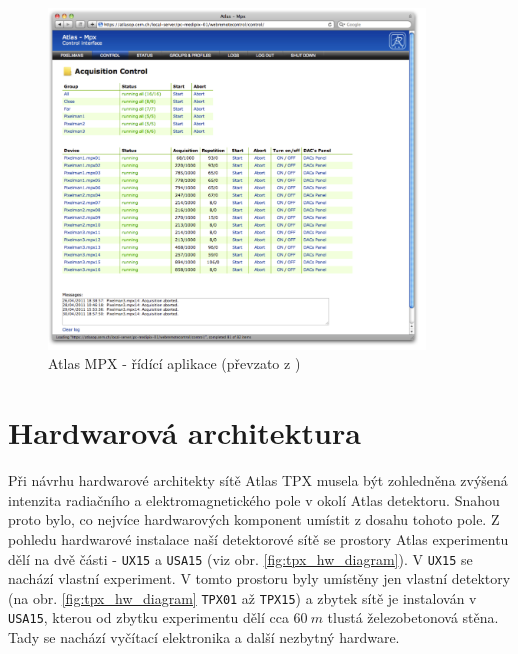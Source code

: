 \begin{figure}[ht]
	\begin{center}
		\includegraphics[width=10cm]{figures/mpx_web.png}
		\caption{Atlas MPX - řídící aplikace (převzato z \cite{TurecekThesis2011})}
		\label{fig:mpx_web}
	\end{center}
\end{figure}

\section{Hardwarová architektura}\label{atlas:hw_arch}
Při návrhu hardwarové architekty sítě Atlas TPX musela být zohledněna zvýšená intenzita radiačního a elektromagnetického pole v okolí Atlas detektoru. Snahou proto bylo, co nejvíce hardwarových komponent umístit z dosahu tohoto pole. Z pohledu hardwarové instalace naší detektorové sítě se prostory Atlas experimentu dělí na dvě části - \texttt{UX15} a \texttt{USA15} (viz obr. \ref{fig:tpx_hw_diagram}). V \texttt{UX15} se nachází vlastní experiment. V tomto prostoru byly umístěny jen vlastní detektory (na obr. \ref{fig:tpx_hw_diagram} \texttt{TPX01} až \texttt{TPX15}) a zbytek sítě je instalován v \texttt{USA15}, kterou od zbytku experimentu dělí cca $60~m$ tlustá železobetonová stěna. Tady se nachází vyčítací elektronika a další nezbytný hardware.

